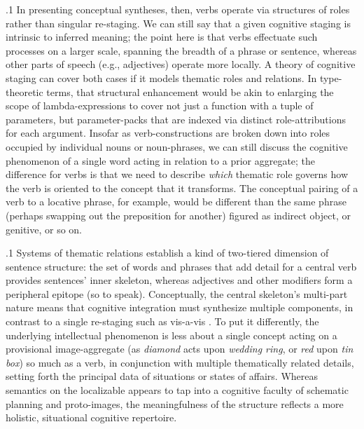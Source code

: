 \documentclass[11pt, twocolumn]{article}
\begin{document}
\p.1{%
In presenting conceptual syntheses, then, verbs operate via structures
of roles rather than singular re-staging.  We can still say that a
given cognitive staging is intrinsic to inferred meaning; the point
here is that verbs effectuate such processes on a larger scale,
spanning the breadth of a phrase or sentence, whereas other
parts of speech (e.g., adjectives) operate more locally.
A theory of cognitive staging can cover both cases if it
models thematic roles and relations.  In type-theoretic
terms, that structural enhancement would be akin to
enlarging the scope of lambda-expressions to cover not just a
function with a tuple of parameters, but parameter-packs that
are indexed via distinct role-attributions for each argument.
Insofar as verb-constructions are broken down into roles
occupied by individual nouns or noun-phrases, we can still
discuss the cognitive phenomenon of a single word
acting in relation to a prior aggregate; the difference
for verbs is that we need to describe \textit{which} thematic
role governs how the verb is oriented to the concept that
it transforms.  The conceptual pairing of a verb to a
locative phrase, for example, would be different than the
same phrase (perhaps swapping out the preposition for another) figured
as indirect object, or genitive, or so on.
} %

\p.1{%
Systems of thematic relations establish a kind of two-tiered
dimension of sentence structure: the set of words and phrases that
add detail for a central verb provides sentences' inner skeleton,
whereas adjectives and other  modifiers form
a peripheral epitope (so to speak).  Conceptually, the
central skeleton's multi-part nature means that cognitive
integration must synthesize multiple components, in contrast to a
single re-staging such as  vis-a-vis .
To put it differently, the underlying intellectual phenomenon
is less about a single concept acting on a provisional image-aggregate
(as \textit{diamond} acts upon \textit{wedding ring},
or \textit{red} upon \textit{tin box}) so much as a verb, in conjunction with
multiple thematically related details, setting forth the principal
data of situations or states of affairs.  Whereas semantics
on the localizable  appears to tap into a
cognitive faculty of schematic planning and proto-images,
the meaningfulness of the  structure reflects a
more holistic, situational cognitive repertoire.
} %
\end{document}
